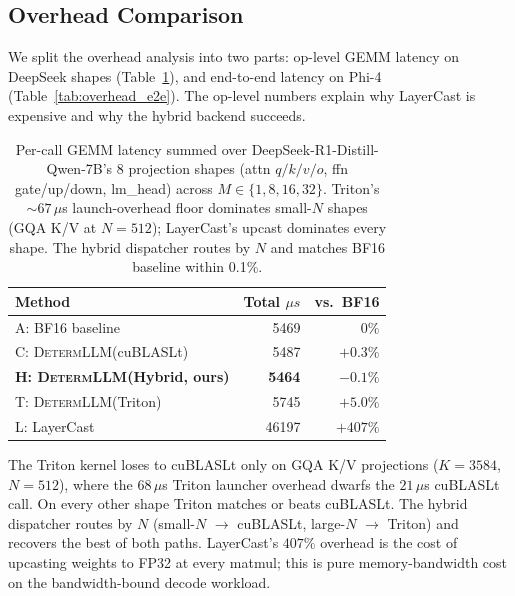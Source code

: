 \documentclass{article}
\newcommand{\dllm}{\textsc{DetermLLM}\xspace}
\begin{document}
\subsection{Overhead Comparison}
\label{sec:overhead}

We split the overhead analysis into two parts: op-level GEMM latency on
DeepSeek shapes (Table~\ref{tab:overhead_op}), and end-to-end latency on
Phi-4 (Table~\ref{tab:overhead_e2e}). The op-level numbers explain why
LayerCast is expensive and why the hybrid backend succeeds.

\begin{table}[h]
\centering
\caption{Per-call GEMM latency summed over DeepSeek-R1-Distill-Qwen-7B's
  8 projection shapes (attn $q/k/v/o$, ffn gate/up/down, lm\_head) across
  $M\!\in\!\{1,8,16,32\}$. Triton's $\sim\!67\,\mu$s launch-overhead floor
  dominates small-$N$ shapes (GQA K/V at $N\!=\!512$); LayerCast's upcast
  dominates every shape. The hybrid dispatcher routes by $N$ and matches
  BF16 baseline within 0.1\%.}
\label{tab:overhead_op}
\begin{tabular}{lrr}
\toprule
Method & Total $\mu s$ & vs.\ BF16 \\
\midrule
A: BF16 baseline                      &  5469 & $0\%$ \\
C: \dllm (cuBLASLt)                   &  5487 & $+0.3\%$ \\
\textbf{H: \dllm (Hybrid, ours)}      &  \textbf{5464} & \textbf{$-0.1\%$} \\
T: \dllm (Triton)                     &  5745 & $+5.0\%$ \\
L: LayerCast~\citep{yuan2025numerical}& 46197 & $+407\%$ \\
\bottomrule
\end{tabular}
\end{table}

The Triton kernel loses to cuBLASLt only on GQA K/V projections
($K\!=\!3584$, $N\!=\!512$), where the $68\,\mu$s Triton launcher overhead
dwarfs the $21\,\mu$s cuBLASLt call. On every other shape Triton matches or
beats cuBLASLt. The hybrid dispatcher routes by $N$ (small-$N$ $\to$
cuBLASLt, large-$N$ $\to$ Triton) and recovers the best of both paths.
LayerCast's $407\%$ overhead is the cost of upcasting weights to FP32 at
every matmul; this is pure memory-bandwidth cost on the bandwidth-bound
decode workload.
\end{document}
